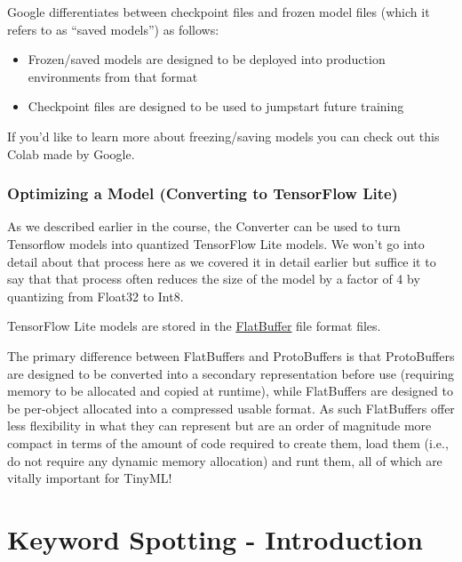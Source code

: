 Google differentiates between checkpoint files and frozen model files (which it refers to as “saved models”) as follows: 

\begin{itemize}
  \item Frozen/saved models are designed to be deployed into production environments from that format
  \item Checkpoint files are designed to be used to jumpstart future training
\end{itemize}

If you'd like to learn more about freezing/saving models you can check out this Colab made by Google.

\subsubsection{Optimizing a Model (Converting to TensorFlow Lite)}

As we described earlier in the course, the Converter can be used to turn Tensorflow models into quantized TensorFlow Lite models. We won’t go into detail about that process here as we covered it in detail earlier but suffice it to say that that process often reduces the size of the model by a factor of 4 by quantizing from Float32 to Int8.

TensorFlow Lite models are stored in the \href{https://www.tensorflow.org/lite/api_docs/cc/class/tflite/flat-buffer-model}{FlatBuffer} file format  files.

The primary difference between FlatBuffers and ProtoBuffers is that ProtoBuffers are designed to be converted into a secondary representation before use (requiring memory to be allocated and copied at runtime), while FlatBuffers are designed to be per-object allocated into a compressed usable format. As such FlatBuffers offer less flexibility in what they can represent but are an order of magnitude more compact in terms of the amount of code required to create them, load them (i.e., do not require any dynamic memory allocation) and runt them, all of which are vitally important for TinyML!



\section{Keyword Spotting - Introduction}

